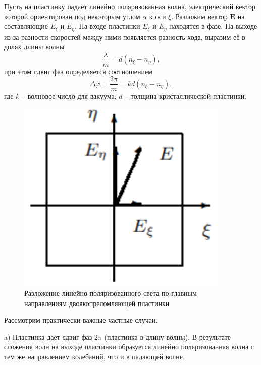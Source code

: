 \documentclass[a4paper,12pt]{article}
\begin{document}
Пусть на пластинку падает линейно поляризованная волна, электрический вектор
которой ориентирован под некоторым углом $\alpha$ к оси $\xi$. Разложим вектор
$\mathbf{E}$ на составляющие $E_\xi$ и $E_\eta$. На входе пластинки $E_\xi$ и $E_\eta$ находятся в фазе. На выходе из-за разности скоростей между ними появляется разность хода, выразим её в долях длины волны
\begin{equation}\label{eq: path difference}
    \frac{\lambda}{m} = d(n_\xi - n_\eta),
\end{equation}
при этом сдвиг фаз определяется соотношением
\begin{equation}\label{eq: phase difference}
    \Delta\varphi = \frac{2 \pi}{m} = kd(n_\xi - n_\eta),
\end{equation}
где $k$ -- волновое число для вакуума, $d$ -- толщина кристаллической пластинки.
\begin{figure}\label{fig: E in crystall}
    \begin{center}
    \vspace{-20pt}
        \includegraphics[width = 0.9\textwidth]{E_in_crystall.png}
    \end{center}
    \caption{Разложение линейно поляризованного света по главным направлениям двоякопреломляющей пластинки}
\end{figure}

Рассмотрим практически важные частные случаи.

a) Пластинка дает сдвиг фаз $2\pi$ (пластинка в длину волны). В результате сложения волн на выходе пластинки образуется линейно поляризованная волна с тем же направлением колебаний, что и в падающей волне.
\end{document}
